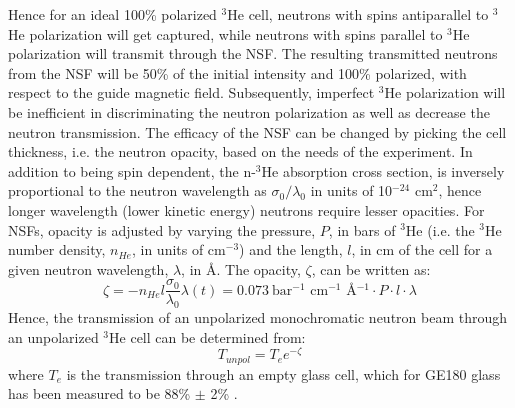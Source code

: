 Hence for an ideal 100\% polarized $^3$He cell, neutrons with spins antiparallel to $^3$He polarization will get captured, while neutrons with spins parallel to $^3$He polarization will transmit through the NSF. The resulting transmitted neutrons from the NSF will be 50\% of the initial intensity and 100\% polarized, with respect to the guide magnetic field. Subsequently, imperfect $^3$He polarization will be inefficient in discriminating the neutron polarization as well as decrease the neutron transmission. The efficacy of the NSF can be changed by picking the cell thickness, i.e. the neutron opacity, based on the needs of the experiment. In addition to being spin dependent, the n-$^3$He absorption cross section, is inversely proportional to the neutron wavelength as $\sigma_0/\lambda_0$ in units of 10$^{-24}$ cm$^2$, hence longer wavelength (lower kinetic energy) neutrons require lesser opacities. For NSFs, opacity is adjusted by varying the pressure, $P$, in bars of $^3$He (i.e. the $^3$He number density, $n_{He}$, in units of cm$^{-3}$) and the length, $l$, in cm of the cell for a given neutron wavelength, $\lambda$, in \AA. The opacity, $\zeta$, can be written as:
\begin{equation}
    \zeta = -n_{He}l\frac{\sigma_0}{\lambda_0}\lambda(t) = 0.073 ~\text{bar$^{-1}$  cm$^{-1}$  \AA$^{-1}$} \cdot P \cdot l \cdot \lambda
    \label{eq:opacity}
\end{equation}
Hence, the transmission of an unpolarized monochromatic neutron beam through an unpolarized $^3$He cell can be determined from:
\begin{equation}
    T_{unpol} = T_e e^{-\zeta}
    \label{eq:Tunpol}
\end{equation}
where $T_e$ is the transmission through an empty glass cell, which for GE180 glass has been measured to be 88\% $\pm$ 2\% \cite{Chupp2007}.

